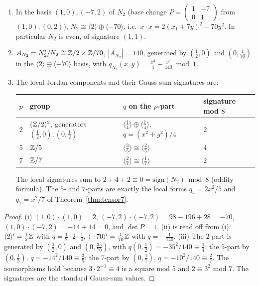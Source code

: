 \begin{proposition}\label{prop:disc8}
\begin{enumerate}[label=(\roman*)]
\item In the basis $(1,0),(-7,2)$ of $N_2$ (base change $P=\left(\begin{smallmatrix}1&-7\\0&1\end{smallmatrix}\right)$ from $(1,0),(0,2)$), $N_2\cong\langle2\rangle\oplus\langle-70\rangle$, i.e.\ $x\cdot x=2(x_1+7y)^2-70y^2$. In particular $N_2$ is even, of signature $(1,1)$.
\item $A_{N_2}=N_2'/N_2\cong\mathbb{Z}/2\times\mathbb{Z}/70$, $|A_{N_2}|=140$, generated by $(\tfrac12,0)$ and $(0,\tfrac1{70})$ in the $\langle2\rangle\oplus\langle-70\rangle$ basis, with $q_{N_2}(x,y)=\tfrac{x^2}4-\tfrac{y^2}{140}\bmod1$.
\item The local Jordan components and their Gauss-sum signatures are:
\begin{center}\small
\begin{tabular}{llll}\toprule
$p$ & group & $q$ on the $p$-part & signature mod $8$\\\midrule
$2$ & $(\mathbb{Z}/2)^2$, generators $(\tfrac12,0),(0,\tfrac12)$ & $\langle\tfrac14\rangle\oplus\langle\tfrac14\rangle$, $q=(x^2+y^2)/4$ & $2$\\
$5$ & $\mathbb{Z}/5$ & $\langle\tfrac35\rangle\cong\langle\tfrac25\rangle$ & $4$\\
$7$ & $\mathbb{Z}/7$ & $\langle\tfrac27\rangle\cong\langle\tfrac17\rangle$ & $2$\\\bottomrule
\end{tabular}
\end{center}
The local signatures sum to $2+4+2\equiv0=\mathrm{sign}(N_2)\bmod8$ (oddity formula). The $5$- and $7$-parts are exactly the local forms $q_5=2x^2/5$ and $q_7=x^2/7$ of Theorem~\ref{thm:tensor7}.
\end{enumerate}
\end{proposition}
\begin{proof}
(i) $(1,0)\cdot(1,0)=2$, $(-7,2)\cdot(-7,2)=98-196+28=-70$, $(1,0)\cdot(-7,2)=-14+14=0$, and $\det P=1$. (ii) is read off from (i): $\langle2\rangle'=\tfrac12\mathbb{Z}$ with $q=\tfrac12\cdot2\cdot\tfrac14$, $\langle-70\rangle'=\tfrac1{70}\mathbb{Z}$ with $q=-\tfrac1{140}$. (iii) The $2$-part is generated by $(\tfrac12,0)$ and $(0,\tfrac{35}{70})$, with $q(0,\tfrac12)=-35^2/140\equiv\tfrac14$; the $5$-part by $(0,\tfrac15)$, $q=-14^2/140\equiv\tfrac35$; the $7$-part by $(0,\tfrac17)$, $q=-10^2/140\equiv\tfrac27$. The isomorphisms hold because $3\cdot2^{-1}\equiv4$ is a square mod $5$ and $2\equiv3^2$ mod $7$. The signatures are the standard Gauss-sum values.
\end{proof}

